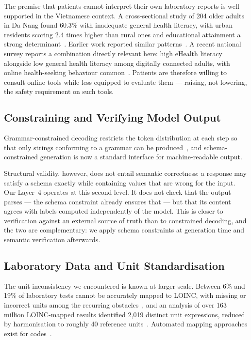\documentclass{svproc}
\begin{document}
The premise that patients cannot interpret their own laboratory reports is
well supported in the Vietnamese context. A cross-sectional study of 204
older adults in Da Nang found 60.3\% with inadequate general health
literacy, with urban residents scoring 2.4 times higher than rural ones
and educational attainment a strong determinant~\cite{danang2025older}.
Earlier work reported similar patterns~\cite{duong2020elderly,hlq_vietnam2025}.
A recent national survey reports a combination directly relevant here:
high eHealth literacy alongside low general health literacy among
digitally connected adults, with online health-seeking behaviour
common~\cite{ehealth_literacy_vn2026}. Patients are therefore willing to
consult online tools while less equipped to evaluate them --- raising,
not lowering, the safety requirement on such tools.

\subsection{Constraining and Verifying Model Output}

Grammar-constrained decoding restricts the token distribution at each step
so that only strings conforming to a grammar can be
produced~\cite{geng2023grammar,willard2023outlines}, and schema-constrained
generation is now a standard interface for machine-readable output.

Structural validity, however, does not entail semantic correctness: a
response may satisfy a schema exactly while containing values that are
wrong for the input. Our Layer~4 operates at this second level. It does
not check that the output parses --- the schema constraint already
ensures that --- but that its content agrees with labels computed
independently of the model. This is closer to verification against an
external source of truth than to constrained decoding, and the two are
complementary: we apply schema constraints at generation time and semantic
verification afterwards.

\subsection{Laboratory Data and Unit Standardisation}

The unit inconsistency we encountered is known at larger scale. Between
6\% and 19\% of laboratory tests cannot be accurately mapped to LOINC,
with missing or incorrect units among the recurring
obstacles~\cite{loinc_harmonize2026}, and an analysis of over 163 million
LOINC-mapped results identified 2{,}019 distinct unit expressions, reduced
by harmonisation to roughly 40 reference units~\cite{unit_harmonize2025}.
Automated mapping approaches exist for codes~\cite{mcdonald2018loinc}.
\end{document}

